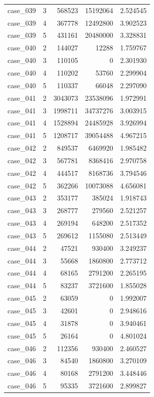 \begin{longtable}{lrrrr}
case\_039 & 3 & 568523 & 15192064 & 2.524545 \\
case\_039 & 4 & 367778 & 12492800 & 3.902523 \\
case\_039 & 5 & 431161 & 20480000 & 3.328831 \\
case\_040 & 2 & 144027 & 12288 & 1.759767 \\
case\_040 & 3 & 110105 & 0 & 2.301930 \\
case\_040 & 4 & 110202 & 53760 & 2.299904 \\
case\_040 & 5 & 110337 & 66048 & 2.297090 \\
case\_041 & 2 & 3043073 & 23538096 & 1.972991 \\
case\_041 & 3 & 1998711 & 34737276 & 3.003915 \\
case\_041 & 4 & 1528894 & 24485928 & 3.926994 \\
case\_041 & 5 & 1208717 & 39054488 & 4.967215 \\
case\_042 & 2 & 849537 & 6469920 & 1.985482 \\
case\_042 & 3 & 567781 & 8368416 & 2.970758 \\
case\_042 & 4 & 444517 & 8168736 & 3.794546 \\
case\_042 & 5 & 362266 & 10073088 & 4.656081 \\
case\_043 & 2 & 353177 & 385024 & 1.918743 \\
case\_043 & 3 & 268777 & 279560 & 2.521257 \\
case\_043 & 4 & 269194 & 648200 & 2.517352 \\
case\_043 & 5 & 269612 & 1155080 & 2.513449 \\
case\_044 & 2 & 47521 & 930400 & 3.249237 \\
case\_044 & 3 & 55668 & 1860800 & 2.773712 \\
case\_044 & 4 & 68165 & 2791200 & 2.265195 \\
case\_044 & 5 & 83237 & 3721600 & 1.855028 \\
case\_045 & 2 & 63059 & 0 & 1.992007 \\
case\_045 & 3 & 42601 & 0 & 2.948616 \\
case\_045 & 4 & 31878 & 0 & 3.940461 \\
case\_045 & 5 & 26164 & 0 & 4.801024 \\
case\_046 & 2 & 112356 & 930400 & 2.460527 \\
case\_046 & 3 & 84540 & 1860800 & 3.270109 \\
case\_046 & 4 & 80168 & 2791200 & 3.448446 \\
case\_046 & 5 & 95335 & 3721600 & 2.899827 \\

\end{longtable}
